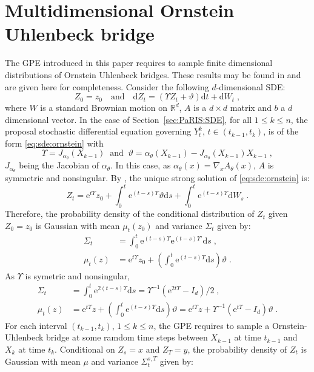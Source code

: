 \documentclass[12pt]{article}
\newcommand{\rmd}{\mathrm{d}}
\newcommand{\eqsp}{\;}
\newcommand{\1}{\mathrm{1}}
\begin{document}
\section{Multidimensional Ornstein Uhlenbeck bridge}
\label{sec:ornstein:bridge}
The GPE introduced in this paper requires to sample finite dimensional distributions of Ornstein Uhlenbeck bridges. These results may be found in \cite{} and are given here for completeness. Consider the following $d$-dimensional SDE:
\begin{equation}
\label{eq:sde:ornstein}
Z_0 = z_0\quad\mbox{and}\quad \rmd Z_t = (\Upsilon Z_t + \vartheta)\rmd t + \rmd W_t\eqsp,
\end{equation}
where $W$ is a standard Brownian motion on $\mathbb{R}^d$, $A$ is a $d\times d$ matrix and $b$ a $d$ dimensional vector. In the case of Section~\ref{sec:PaRIS:SDE}, for all $1\le k \le n$, the proposal stochastic differential equation governing $Y_t^k$, $t\in(t_{k-1},t_k)$, is of the form \eqref{eq:sde:ornstein} with
\[
\Upsilon = J_{\alpha_{\theta}}(X_{k-1})\;\;\mbox{and}\;\; \vartheta =\alpha_{\theta}(X_{k-1}) - J_{\alpha_{\theta}}(X_{k-1})X_{k-1}\eqsp,
\]
$J_{\alpha_{\theta}}$ being the Jacobian of $\alpha_{\theta}$. In this case, as $\alpha_{\theta}(x) = \nabla_x A_{\theta}(x)$, $A$ is symmetric and nonsingular. By \cite[Section~5.6]{karatzas:shreve:1991}, the unique strong solution of \eqref{eq:sde:ornstein} is:
\[
Z_t = \mathrm{e}^{t\Upsilon}z_0 + \int_0^t\mathrm{e}^{(t-s)\Upsilon}\vartheta \rmd s + \int_0^t\mathrm{e}^{(t-s)\Upsilon} \rmd W_s\eqsp.
\]
Therefore, the probability density of the conditional distribution of $Z_t$ given $Z_0 = z_0$ is Gaussian with mean $\mu_t(z_0)$ and variance $\Sigma_{t}$ given by:
\begin{align*}
\Sigma_{t} &= \int_0^{t} \mathrm{e}^{(t -s)\Upsilon}\mathrm{e}^{(t -s)\Upsilon'}\rmd s\eqsp,\\
\mu_{t}(z) &= \mathrm{e}^{t \Upsilon}z_0 + \left(\int_0^t\mathrm{e}^{(t-s)\Upsilon} \rmd s\right)\vartheta\eqsp.
\end{align*}
As $\Upsilon$ is symetric and nonsingular,
\begin{align*}
\Sigma_{t} &= \int_0^{t} \mathrm{e}^{2(t -s)\Upsilon}\rmd s = \Upsilon^{-1}(\mathrm{e}^{2t\Upsilon}-I_d)/2\eqsp,\\
\mu_{t}(z) &= \mathrm{e}^{t \Upsilon}z + \left(\int_0^t\mathrm{e}^{(t-s)\Upsilon} \rmd s\right)\vartheta = \mathrm{e}^{t \Upsilon}z + \Upsilon^{-1}(\mathrm{e}^{t\Upsilon}-I_d)\vartheta \eqsp.
\end{align*}
For each interval $(t_{k-1},t_k)$, $1\le k \le n$, the GPE requires to sample a Ornstein-Uhlenbeck bridge at some ramdom time steps between $X_{k-1}$ at time $t_{k-1}$ and $X_k$ at time $t_k$. Conditional on $Z_s = x$ and $Z_T = y$, the probability density of $Z_t$ is Gaussian with mean $\mu$ and variance $\Sigma_t^{s,T}$ given by: 
\end{document}
